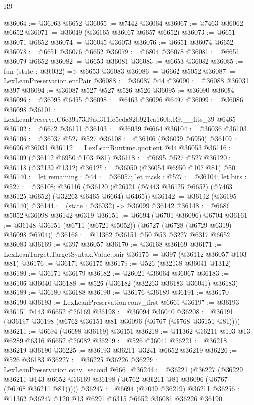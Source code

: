 \begin{lexlean}{R9}
\begin{coremodule}
@36064 := @36063 @6652
@36065 := @7442 @36064
@36067 := @7463 @36062 @6652
@36071 := @36049 (@36065 @36067 @6657 @6652)
@36073 := @6651 @36071 @6652
@36074 := @36045 @36073
@36076 := @6651 @36074 @6652
@36078 := @6651 @36076 @6652
@36079 := @6804 @36078
@36081 := @6651 @36079 @6652
@36082 := @6653 @36081
@36083 := @6653 @36082
@36085 := fun (state : @36032) => @6653 @36083
@36086 := @6662 @5052
@36087 := LexLeanPreservation.encPair
@36088 := @36087 @44
@36090 := @36088 @36031 @397
@36094 := @36087 @527 @527 @526 @526
@36095 := @36090 @36094
@36096 := @36095 @6465
@36098 := @6463 @36096 @6497
@36099 := @36086 @36098
@36101 := LexLeanPreserve.C6e39a73d9ad311fe5eda82b921ca160b.R9.__fits_39 @6465
@36102 := @6672 @36101
@36103 := @36039 @6664
@36104 := @36036 @36103
@36106 := @36037 @527 @527
@36108 := @36106 (@36039 @6950)
@36109 := @6696 @36031
@36112 := LexLeanRuntime.quotient @44 @36053
@36116 := @36109 (@36112 @6950 @103 @81)
@36118 := @6695 @527 @527
@36120 := @36118 (@32139 @1312)
@36125 := @36050 (@36054 @6950 @103 @81) @50
@36140 := let remaining : @44 := @36057;
  let mask : @527 := @36104;
  let bits : @527 := @36108;
  @36116 (@36120 (@26021 (@7443 @36125 @6652) (@7463 @36125 @6652) (@32263 @6465 @6664) @6465))
@36142 := @36102 (@36095 @36140)
@36144 := (state : @36032) -> @36099 @36142
@36148 := @6686 @5052 @36098 @36142 @6319
@36151 := @6694 (@6701 @36096) @6704
@36161 := @36148 @36151 (@6711 (@6721 @5052)) (@6727 (@6728 (@6729 @6319) @36098 @6704))
@36168 := @11362 @36151 @50 @53 @3227 @6317 @6652 @36083
@36169 := @397 @36057
@36170 := @36168 @36169
@36171 := LexLeanTarget.TargetSyntax.Value.pair
@36175 := @397 (@36112 @36057 @103 @81)
@36176 := @36171 @36175
@36179 := @526 (@32138 @36041 @1312)
@36180 := @36171 @36179
@36182 := @26021 @36064 @36067
@36183 := @36106 @36040
@36188 := @526 (@36182 (@32263 @36183 @36041) @36183)
@36189 := @36180 @36188
@36190 := @36176 @36189
@36191 := @36170 @36190
@36193 := LexLeanPreservation.conv_first @6661
@36197 := @36193 @36151 @143 @6652 @36169
@36198 := @36094 @36040
@36208 := @36191 (@36197 @36198 (@6762 @36151 @81 @36096 (@6767 (@6768 @36151 @81))))
@36211 := @6694 (@6698 @36169) @36151
@36218 := @11362 @36211 @103 @13 @6289 @6316 @6652 @36082
@36219 := @526 @36041
@36221 := @36218 @36219 @36190
@36225 := @36193 @36211 @3241 @6652 @36219
@36226 := @526 @36183
@36227 := @36225 @36226
@36229 := LexLeanPreservation.conv_second @6661
@36244 := @36221
    (@36227
      (@36229 @36211 @143 @6652 @36169 @36198 (@6762 @36211 @81 @36096 (@6767 (@6768 @36211 @81)))))
@36247 := @6694 (@7049 @36219) @36211
@36256 := @11362 @36247 @120 @13 @6291 @6315 @6652 @36081 @36226 @36190

\end{coremodule}
\end{lexlean}
